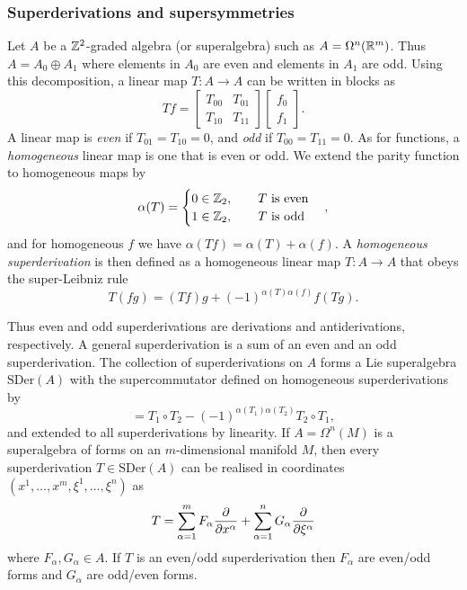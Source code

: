 \documentclass[11pt,a4paper]{article}
\begin{document}
\subsubsection{Superderivations and supersymmetries}
Let $A$ be a $\mathbb{Z}^2$-graded algebra (or superalgebra) such as
$A = \Omega^{n}(\mathbb{R}^{m})$.  Thus $A=A_0\oplus A_1$ where elements in $A_0$
are even and elements in $A_1$ are odd.  Using this decomposition, a
linear map $T\colon A \rightarrow A$ can be written in blocks as
\begin{equation}
Tf = \begin{bmatrix}
T_{00}& T_{01}\\
T_{10}&T_{11}
\end{bmatrix}
\begin{bmatrix}
f_0\\f_1
\end{bmatrix}.
\end{equation}
A linear map is \emph{even} if $T_{01} = T_{10} = 0$, and 
\emph{odd} if $T_{00} = T_{11} = 0$. As for functions, a \emph{homogeneous} linear map
is one that is even or odd.
We extend the parity function to homogeneous maps by
\begin{equation}
\alpha(T) =  \begin{cases} 0 \in \mathbb{Z}_2, \qquad T \text{ is even}
  \\
1 \in \mathbb{Z}_2,\qquad T \text{ is odd}
\end{cases},
\end{equation}
and for homogeneous $f$ we have $\alpha(Tf) = \alpha(T)+\alpha(f)$. A
\emph{homogeneous superderivation} is then defined as a
homogeneous linear map $T\colon A
\rightarrow A$ that obeys the super-Leibniz rule
\begin{equation}\label{eq:super-leib}
  T(fg) =  (Tf) g + (-1)^{\alpha(T)\alpha(f)}f(Tg).
\end{equation}

Thus even and odd superderivations are derivations and
antiderivations, respectively. 
A general superderivation is a sum of an even
and an odd superderivation. The collection of superderivations on $A$
forms a Lie superalgebra $\mathrm{SDer}(A)$ with the supercommutator
defined on homogeneous superderivations by
\begin{equation}
[T_1, T_2] = T_1\circ T_2 - (-1)^{\alpha(T_1)\alpha(T_2)}T_2\circ T_1,
\end{equation}
and extended to all superderivations by linearity. If $A= \Omega^{n}(M)$
is a superalgebra of forms on an $m$-dimensional manifold $M$, then
every superderivation $T \in \mathrm{SDer}(A)$ can be realised in
coordinates $(x^1,\dots, x^{m},\xi^1,\dots,\xi^{n})$ as
\begin{equation}
T = \sum_{\alpha = 1}^{m} F_\alpha\frac{\partial }{\partial x^{\alpha}} + \sum_{\alpha =
  1}^{n} G_\alpha\frac{\partial }{\partial \xi^{\alpha}} 
\end{equation}
where $F_\alpha,G_\alpha\in A$. If $T$ is an even/odd superderivation
then $F_\alpha$ are even/odd forms and $G_\alpha$ are odd/even forms.
\end{document}
